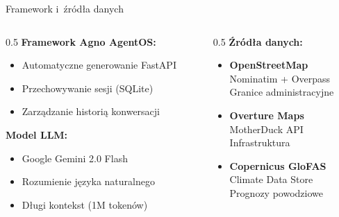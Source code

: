 \documentclass[aspectratio=169]{beamer}
\begin{document}
\begin{frame}{Framework i~źródła danych}
\begin{columns}[T]
\begin{column}{0.5\textwidth}
\textbf{Framework Agno AgentOS:}
\begin{itemize}
    \item Automatyczne generowanie FastAPI
    \item Przechowywanie sesji (SQLite)
    \item Zarządzanie historią konwersacji
\end{itemize}

\vspace{0.5cm}

\textbf{Model LLM:}
\begin{itemize}
    \item Google Gemini 2.0 Flash
    \item Rozumienie języka naturalnego
    \item Długi kontekst (1M tokenów)
\end{itemize}
\end{column}

\begin{column}{0.5\textwidth}
\textbf{Źródła danych:}
\begin{itemize}
    \item \textbf{OpenStreetMap}\\
    Nominatim + Overpass\\
    Granice administracyjne

    \vspace{0.3cm}

    \item \textbf{Overture Maps}\\
    MotherDuck API\\
    Infrastruktura

    \vspace{0.3cm}

    \item \textbf{Copernicus GloFAS}\\
    Climate Data Store\\
    Prognozy powodziowe
\end{itemize}
\end{column}
\end{columns}
\end{frame}
\end{document}
